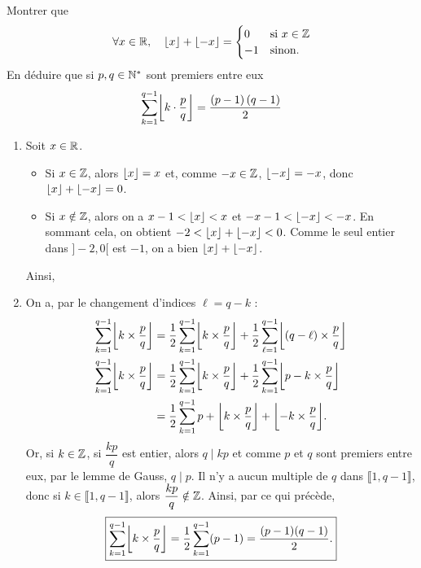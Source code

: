 \documentclass{magnolia}
\begin{document}
\begin{questions}
\question Montrer que
  \[\forall x\in\mathbb{R} ,\quad \left\lfloor x\right\rfloor+\left\lfloor-x\right\rfloor=
    \begin{cases}
    0  & \text{si $x\in\mathbb{Z}$}\\
    -1 & \text{sinon.}
    \end{cases}\]
\question En déduire que si $p,q\in{\mathbb{N}^*}$ sont premiers entre eux
  \[\sum_{k=1}^{q-1} \ent{k\cdot \frac{p}{q}}=\frac{\p{p-1}\p{q-1}}{2}\]
\end{questions}
\begin{sol}
\begin{enumerate}
  \item Soit $x \in \mathbb{R}$. 
    \begin{itemize}
      \item Si $x \in \mathbb{Z}$, alors $\left\lfloor x\right\rfloor = x$ et, comme $-x \in \mathbb{Z}$, $\left\lfloor-x\right\rfloor = -x$, donc $\left\lfloor x\right\rfloor + \left\lfloor-x\right\rfloor = 0$. 
      \item Si $x \notin \mathbb{Z}$, alors on a $x-1 < \left\lfloor x\right\rfloor < x$ et $-x-1 < \left\lfloor-x\right\rfloor < -x$. En sommant cela, on obtient $-2 < \left\lfloor x\right\rfloor + \left\lfloor-x\right\rfloor < 0$. 
	Comme le seul entier dans $]-2,0[$ est $-1$, on a bien $ \left\lfloor x\right\rfloor + \left\lfloor-x\right\rfloor$.
    \end{itemize}
    Ainsi, 
  \item On a, par le changement d'indices $\ell = q-k$ : 
    \begin{align*}
      \displaystyle\sum_{k=1}^{q-1} \ent{k \times \frac{p}{q}} &= \dfrac{1}{2} \displaystyle\sum_{k=1}^{q-1} \ent{k \times \frac{p}{q}} + \dfrac{1}{2}\displaystyle\sum_{\ell=1}^{q-1} \ent{(q-\ell) \times \frac{p}{q}} \\
      \displaystyle\sum_{k=1}^{q-1} \ent{k \times \frac{p}{q}} &= \dfrac{1}{2} \displaystyle\sum_{k=1}^{q-1} \ent{k \times \frac{p}{q}} + \dfrac{1}{2}\displaystyle\sum_{k=1}^{q-1} \ent{p - k\times \frac{p}{q}} \\
                                                       &= \dfrac{1}{2} \displaystyle\sum_{k=1}^{q-1} p + \ent{k \times \frac{p}{q}} + \ent{-k \times \frac{p}{q}}.
    \end{align*}
    Or, si $k \in \mathbb{Z}$, si $\dfrac{kp}{q}$ est entier, alors $q \mid kp$ et comme $p$ et $q$ sont premiers entre eux, par le lemme de Gauss, $q\mid p$.
    Il n'y a aucun multiple de $q$ dans $\llbracket 1,q-1 \rrbracket$, donc si $k\in \llbracket 1,q-1 \rrbracket$, alors $\dfrac{kp}{q} \notin \mathbb{Z}$. 
    Ainsi, par ce qui précède, 
    \begin{equation*}
      \boxed{\displaystyle\sum_{k=1}^{q-1} \ent{k \times \frac{p}{q}} = \dfrac{1}{2} \displaystyle\sum_{k=1}^{q-1} (p-1) = \dfrac{(p-1)(q-1)}{2}.}
    \end{equation*}
\end{enumerate}
\end{sol}
\end{document}
